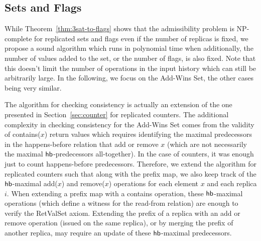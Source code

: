 
\subsection{Sets and Flags}
\label{sec:ptime:sets}

While Theorem~\ref{thm:3sat-to-flags} shows that the admissibility problem is NP-complete for replicated sets and flags even if the number of replicas is fixed, we propose a sound algorithm which runs in polynomial time when additionally, the number of values added to the set, or the number of flags, is also fixed. Note that this doesn't limit the number of operations in the input history which can still be arbitrarily large. In the following, we focus on the Add-Wins Set, the other cases being very similar.

The algorithm for checking consistency is actually an extension of the one presented in Section~\ref{sec:counter} for replicated counters.
The additional complexity in checking consistency for the Add-Wins Set comes from the validity of {\sf contains}($x$) return values which requires identifying the maximal predecessors in the happens-before relation that add or remove $x$ (which are not necessarily the maximal $\textsf{hb}$-predecessors all-together). In the case of counters, it was enough just to count happens-before predecessors.
Therefore, we extend the algorithm for replicated counters such that along with the prefix map, we also keep track of the $\textsf{hb}$-maximal {\sf add}($x$) and {\sf remove}($x$) operations for each element $x$ and each replica $i$.
When extending a prefix map with a {\sf contains} operation, these $\textsf{hb}$-maximal operations (which define a witness for the read-from relation) are enough to verify the {\sc RetValSet} axiom. Extending the prefix of a replica with an {\sf add} or {\sf remove} operation (issued on the same replica), or by merging the prefix of another replica, may require an update of these $\textsf{hb}$-maximal predecessors.


